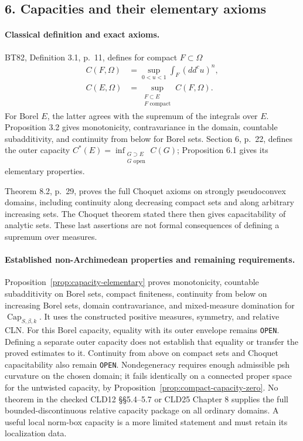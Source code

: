 \documentclass[11pt,a4paper]{article}
\numberwithin{equation}{section}
\theoremstyle{definition}
\theoremstyle{remark}
\begin{document}
\subsection{6. Capacities and their elementary axioms}

\paragraph{Classical definition and exact axioms.}
BT82, Definition 3.1, p.~11, defines for compact \(F\subset\Omega\)
\[
 \begin{aligned}
 C(F,\Omega)&=\sup_{0<u<1}\int_F(dd^cu)^n,\\
 C(E,\Omega)&=\sup_{\substack{F\subset E\\F\text{ compact}}}C(F,\Omega).
 \end{aligned}
\]
For Borel \(E\), the latter agrees with the supremum of the integrals
over \(E\). Proposition 3.2 gives monotonicity, contravariance in the
domain, countable subadditivity, and continuity from below for Borel
sets. Section 6, p.~22, defines the outer capacity
\(C^*(E)=\inf_{\substack{G\supset E\\G\text{ open}}}C(G)\);
Proposition 6.1 gives its elementary properties.
\cite[Definition 3.1, Proposition 3.2, \S6]{BT82}

Theorem 8.2, p.~29, proves the full Choquet axioms on strongly
pseudoconvex domains, including continuity along decreasing compact sets
and along arbitrary increasing sets. The Choquet theorem stated there
then gives capacitability of analytic sets. These last assertions are
not formal consequences of defining a supremum over measures.
\cite[Theorem 8.2 and the following Choquet theorem]{BT82}

\paragraph{Established non-Archimedean properties and remaining requirements.}
Proposition~\ref{prop:capacity-elementary} proves monotonicity, countable
subadditivity on Borel sets, compact finiteness, continuity from below on
increasing Borel sets, domain contravariance, and mixed-measure domination
for \(\operatorname{Cap}_{S,\beta,k}\). It uses the constructed positive
measures, symmetry, and relative CLN. For this Borel capacity, equality
with its outer envelope remains \texttt{OPEN}. Defining a separate outer
capacity does not establish that equality or transfer the proved estimates
to it. Continuity from above on compact sets and Choquet capacitability
also remain \texttt{OPEN}. Nondegeneracy requires enough admissible psh curvature on
the chosen domain; it fails identically on a connected proper space for
the untwisted capacity, by Proposition~\ref{prop:compact-capacity-zero}.
No theorem in the checked CLD12 \S\S5.4--5.7 or CLD25 Chapter 8 supplies
the full bounded-discontinuous relative capacity package on all ordinary
domains. A useful local norm-box capacity is a more limited statement and
must retain its localization data.
\end{document}

